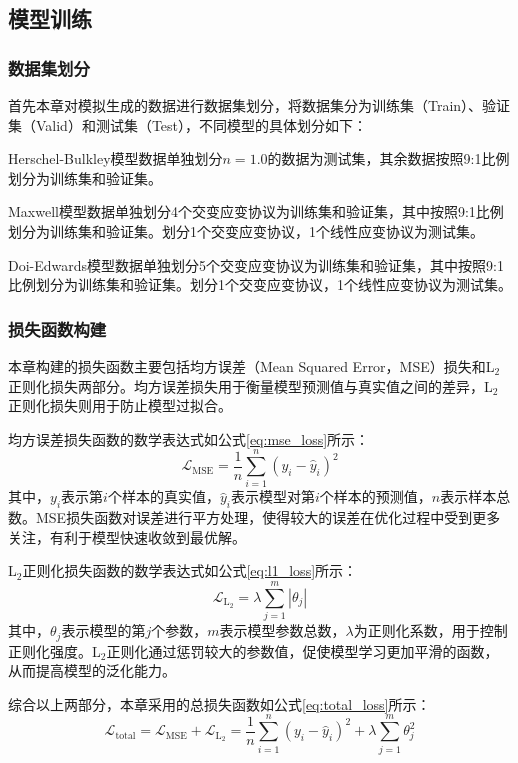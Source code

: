 \subsection{模型训练}
\subsubsection{数据集划分}
首先本章对模拟生成的数据进行数据集划分，将数据集分为训练集（Train）、验证集（Valid）和测试集（Test），不同模型的具体划分如下：

Herschel-Bulkley模型数据单独划分$n=1.0$的数据为测试集，其余数据按照9:1比例划分为训练集和验证集。

Maxwell模型数据单独划分4个交变应变协议为训练集和验证集，其中按照9:1比例划分为训练集和验证集。划分1个交变应变协议，1个线性应变协议为测试集。

Doi-Edwards模型数据单独划分5个交变应变协议为训练集和验证集，其中按照9:1比例划分为训练集和验证集。划分1个交变应变协议，1个线性应变协议为测试集。

\subsubsection{损失函数构建}
本章构建的损失函数主要包括均方误差（Mean Squared Error，MSE）损失和L$_2$正则化损失两部分。均方误差损失用于衡量模型预测值与真实值之间的差异，L$_2$正则化损失则用于防止模型过拟合。

均方误差损失函数的数学表达式如公式\eqref{eq:mse_loss}所示：
\begin{equation}
  \mathcal{L}_{\text{MSE}} = \frac{1}{n} \sum_{i=1}^{n} (y_i - \hat{y}_i)^2 \label{eq:mse_loss}
\end{equation}
其中，$y_i$表示第$i$个样本的真实值，$\hat{y}_i$表示模型对第$i$个样本的预测值，$n$表示样本总数。MSE损失函数对误差进行平方处理，使得较大的误差在优化过程中受到更多关注，有利于模型快速收敛到最优解。

L$_2$正则化损失函数的数学表达式如公式\eqref{eq:l1_loss}所示：
\begin{equation}
  \mathcal{L}_{\text{L$_2$}} = \lambda \sum_{j=1}^{m} |\theta_j| \label{eq:l1_loss}
\end{equation}
其中，$\theta_j$表示模型的第$j$个参数，$m$表示模型参数总数，$\lambda$为正则化系数，用于控制正则化强度。L$_2$正则化通过惩罚较大的参数值，促使模型学习更加平滑的函数，从而提高模型的泛化能力。

综合以上两部分，本章采用的总损失函数如公式\eqref{eq:total_loss}所示：
\begin{equation}
  \mathcal{L}_{\text{total}} = \mathcal{L}_{\text{MSE}} + \mathcal{L}_{\text{L$_2$}} = \frac{1}{n} \sum_{i=1}^{n} (y_i - \hat{y}_i)^2 + \lambda \sum_{j=1}^{m} \theta_j^2 \label{eq:total_loss}
\end{equation}

